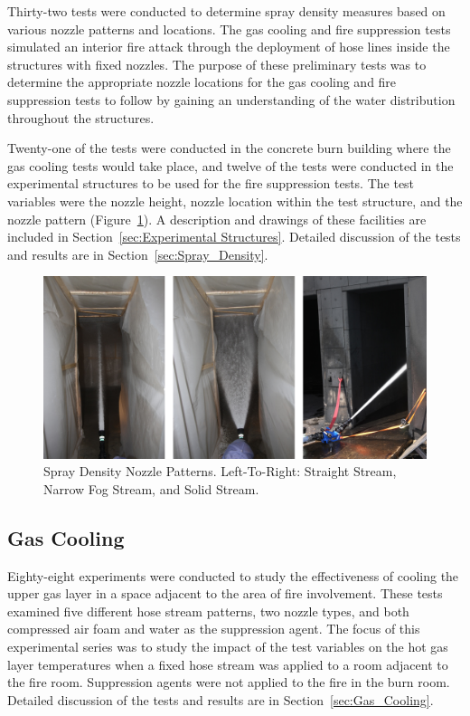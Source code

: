 \documentclass[12pt,oneside]{book}
\begin{document}
Thirty-two tests were conducted to determine spray density measures based on various nozzle patterns and locations. The gas cooling and fire suppression tests simulated an interior fire attack through the deployment of hose lines inside the structures with fixed nozzles. The purpose of these preliminary tests was to determine the appropriate nozzle locations for the gas cooling and fire suppression tests to follow by gaining an understanding of the water distribution throughout the structures.

Twenty-one of the tests were conducted in the concrete burn building where the gas cooling tests would take place, and twelve of the tests were conducted in the experimental structures to be used for the fire suppression tests. The test variables were the nozzle height, nozzle location within the test structure, and the nozzle pattern (Figure~\ref{fig:Spray_Density_Nozzle_Patterns}). A description and drawings of these facilities are included in Section~\ref{sec:Experimental Structures}. Detailed discussion of the tests and results are in Section~\ref{sec:Spray_Density}.

\begin{figure}[!ht]
	\includegraphics[width=6in]{../Figures/Pictures/Flows}
	\caption[Spray Density Nozzle Patterns]{Spray Density Nozzle Patterns. Left-To-Right: Straight Stream, Narrow Fog Stream, and Solid Stream.}
	\label{fig:Spray_Density_Nozzle_Patterns}
\end{figure}

\subsection{Gas Cooling}
\label{sec:desc_Gas_Cooling}

Eighty-eight experiments were conducted to study the effectiveness of cooling the upper gas layer in a space adjacent to the area of fire involvement. These tests examined five different hose stream patterns, two nozzle types, and both compressed air foam and water as the suppression agent. The focus of this experimental series was to study the impact of the test variables on the hot gas layer temperatures when a fixed hose stream was applied to a room adjacent to the fire room. Suppression agents were not applied to the fire in the burn room.  Detailed discussion of the tests and results are in Section~\ref{sec:Gas_Cooling}.
\end{document}
